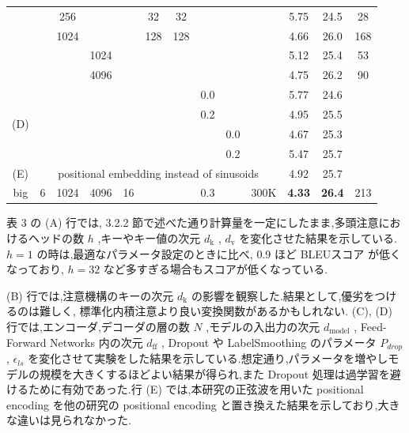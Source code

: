 \documentclass{jarticle}     %
\begin{document}
\begin{table}[htb]
\begin{tabular}{c|ccccccccc|ccc}
                         & & 256 & & & 32 & 32 & & & & 5.75 & 24.5 & 28        \\
                         & & 1024 & & & 128 & 128 & & & & 4.66 & 26.0 & 168        \\
                         & & & 1024 & & & & & & & 5.12 & 25.4 & 53        \\
                         & & & 4096 & & & & & & & 4.75 & 26.2 & 90        \\
      \midrule
      \multirow{4}{*}{(D)} & & & & & & & 0.0 & & & 5.77 & 24.6 &         \\
                         & & & & & & & 0.2 & & & 4.95 & 25.5 &        \\
                         & & & & & & & & 0.0 & & 4.67 & 25.3 &        \\
                         & & & & & & & & 0.2 & & 5.47 & 25.7 &        \\
      \midrule
      (E) & \multicolumn{9}{c|}{positional embedding instead of sinusoids}& 4.92 & 25.7 &  \\
      \midrule
      big & 6 & 1024 & 4096 & 16 & & & 0.3 & & 300K & \textbf{4.33} & \textbf{26.4} & 213 \\


      \bottomrule
  \end{tabular}
\end{table}

表 3 の (A) 行では, 3.2.2 節で述べた通り計算量を一定にしたまま,多頭注意におけるヘッドの数 $h$ ,キーやキー値の次元 $d_\mathrm{k}$ , $d_\mathrm{v}$ を変化させた結果を示している. $h=1$ の時は,最適なパラメータ設定のときに比べ, 0.9 ほど BLEUスコア が低くなっており, $h=32$ など多すぎる場合もスコアが低くなっている.\par
(B) 行では,注意機構のキーの次元 $d_\mathrm{k}$ の影響を観察した.結果として,優劣をつけるのは難しく, 標準化内積注意より良い変換関数があるかもしれない. (C), (D) 行では,エンコーダ,デコーダの層の数 $N$ ,モデルの入出力の次元 $d_\mathrm{model}$ , Feed-Forward Networks 内の次元 $d_\mathrm{ff}$ , Dropout や LabelSmoothing のパラメータ $P_{drop}$ , $\epsilon_{ls}$ を変化させて実験をした結果を示している.想定通り,パラメータを増やしモデルの規模を大きくするほどよい結果が得られ,また Dropout 処理は過学習を避けるために有効であった.行 (E) では,本研究の正弦波を用いた positional encoding を他の研究の positional encoding\cite{8} と置き換えた結果を示しており,大きな違いは見られなかった.
\end{document}
